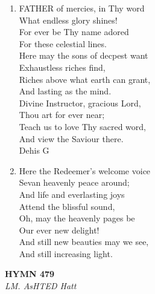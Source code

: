 \documentclass[11pt,a4paper]{article}
\begin{document}
\begin{enumerate}
    \item FATHER of mercies, in Thy word \\
        What endless glory shines! \\
        For ever be Thy name adored \\
        For these celestial lines. \\
        Here may the sons of decpest want \\
        Exhaustless riches find, \\
        Riches above what earth can grant, \\
        And lasting as the mind. \\
        Divine Instructor, gracious Lord, \\
        Thou art for ever near; \\
        Teach us to love Thy sacred word, \\
        And view the Saviour there. \\
        Dehis G

    \item Here the Redeemer's welcome voice \\
        Sevan heavenly peace around; \\
        And life and everlasting joys \\
        Attend the blissful sound, \\
        Oh, may the heavenly pages be \\
        Our ever new delight! \\
        And still new beauties may we see, \\
        And still increasing light.

\end{enumerate}

\newpage
\begin{center}
    {\Large \textbf{HYMN 479}}
    \\
    \textit{LM. AsHTED Hatt}
\end{center}
\vspace{1em}
\end{document}
